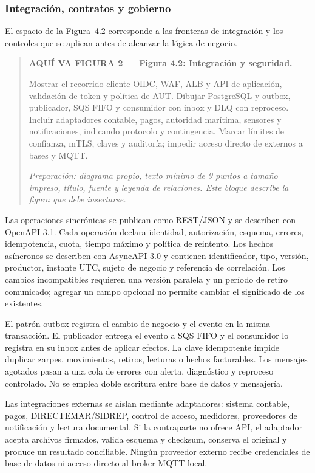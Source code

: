 \documentclass[11pt,letterpaper]{report}
\begin{document}
\subsubsection*{Integración, contratos y gobierno}

El espacio de la Figura~4.2 corresponde a las fronteras de integración y los controles que se aplican antes de alcanzar la lógica de negocio.
\par\medskip
\begin{quote}\textbf{AQUÍ VA FIGURA 2 — Figura 4.2: Integración y seguridad.}\par Mostrar el recorrido cliente OIDC, WAF, ALB y API de aplicación, validación de token y política de AUT. Dibujar PostgreSQL y outbox, publicador, SQS FIFO y consumidor con inbox y DLQ con reproceso. Incluir adaptadores contable, pagos, autoridad marítima, sensores y notificaciones, indicando protocolo y contingencia. Marcar límites de confianza, mTLS, claves y auditoría; impedir acceso directo de externos a bases y MQTT.\par\textit{Preparación: diagrama propio, texto mínimo de 9 puntos a tamaño impreso, título, fuente y leyenda de relaciones. Este bloque describe la figura que debe insertarse.}\end{quote}
\par\medskip

Las operaciones sincrónicas se publican como REST/JSON y se describen con OpenAPI 3.1. Cada operación declara identidad, autorización, esquema, errores, idempotencia, cuota, tiempo máximo y política de reintento. Los hechos asíncronos se describen con AsyncAPI 3.0 y contienen identificador, tipo, versión, productor, instante UTC, sujeto de negocio y referencia de correlación. Los cambios incompatibles requieren una versión paralela y un período de retiro comunicado; agregar un campo opcional no permite cambiar el significado de los existentes.

El patrón outbox registra el cambio de negocio y el evento en la misma transacción. El publicador entrega el evento a SQS FIFO y el consumidor lo registra en su inbox antes de aplicar efectos. La clave idempotente impide duplicar zarpes, movimientos, retiros, lecturas o hechos facturables. Los mensajes agotados pasan a una cola de errores con alerta, diagnóstico y reproceso controlado. No se emplea doble escritura entre base de datos y mensajería.

Las integraciones externas se aíslan mediante adaptadores: sistema contable, pagos, DIRECTEMAR/SIDREP, control de acceso, medidores, proveedores de notificación y lectura documental. Si la contraparte no ofrece API, el adaptador acepta archivos firmados, valida esquema y checksum, conserva el original y produce un resultado conciliable. Ningún proveedor externo recibe credenciales de base de datos ni acceso directo al broker MQTT local.
\end{document}
